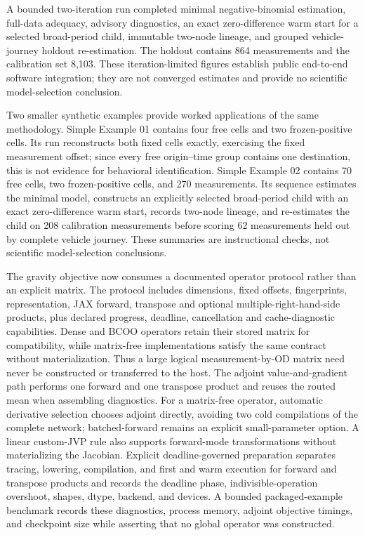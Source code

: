 A bounded two-iteration run completed minimal negative-binomial estimation,
full-data adequacy, advisory diagnostics, an exact zero-difference warm start for
a selected broad-period child, immutable two-node lineage, and grouped
vehicle-journey holdout re-estimation.  The holdout contains 864 measurements and
the calibration set 8,103.  These iteration-limited figures establish public
end-to-end software integration; they are not converged estimates and provide no
scientific model-selection conclusion.

Two smaller synthetic examples provide worked applications of the same
methodology.  Simple Example 01 contains four free cells and two
frozen-positive cells.  Its run reconstructs both fixed cells exactly,
exercising the fixed measurement offset; since every free origin--time group
contains one destination, this is not evidence for behavioral identification.
Simple Example 02 contains 70 free cells, two frozen-positive cells, and 270
measurements.  Its sequence estimates the minimal model, constructs an
explicitly selected broad-period child with an exact zero-difference warm
start, records two-node lineage, and re-estimates the child on 208 calibration
measurements before scoring 62 measurements held out by complete vehicle
journey.  These summaries are instructional checks, not scientific
model-selection conclusions.

The gravity objective now consumes a documented operator protocol rather than
an explicit matrix.  The protocol includes dimensions, fixed offsets,
fingerprints, representation, JAX forward, transpose and optional
multiple-right-hand-side products, plus declared progress, deadline,
cancellation and cache-diagnostic capabilities.  Dense and BCOO operators
retain their stored matrix for compatibility, while matrix-free
implementations satisfy the same contract without materialization.  Thus a large logical
measurement-by-OD matrix need never be constructed or transferred to the host.
The adjoint value-and-gradient path performs one forward and one transpose
product and reuses the routed mean when assembling diagnostics.  For a
matrix-free operator, automatic derivative selection chooses adjoint directly,
avoiding two cold compilations of the complete network; batched-forward remains
an explicit small-parameter option.  A linear custom-JVP rule also supports
forward-mode transformations without materializing the Jacobian.  Explicit
deadline-governed preparation separates tracing, lowering, compilation, and
first and warm execution for forward and transpose products and records the
deadline phase, indivisible-operation overshoot, shapes, dtype, backend, and
devices.  A bounded packaged-example benchmark records these diagnostics,
process memory, adjoint objective timings, and checkpoint size while asserting
that no global operator was constructed.

